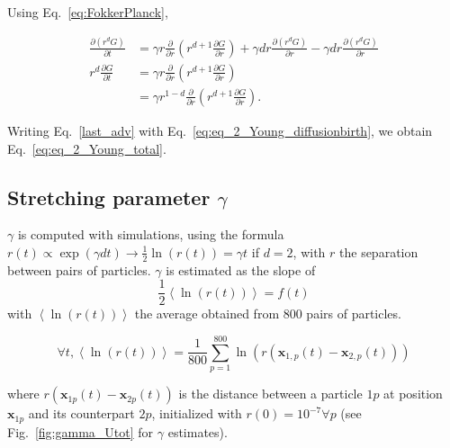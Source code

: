 Using Eq.~\ref{eq:FokkerPlanck},

\begin{subequations}

\begin{align}
\frac{\partial(r^{d}G)}{\partial t} & =\gamma r\frac{\partial}{\partial r}\left(r^{d+1}\frac{\partial G}{\partial r}\right)+\gamma dr\frac{\partial(r^{d}G)}{\partial r}-\gamma dr\frac{\partial(r^{d}G)}{\partial r}\label{computedGdQ1-1-1}\\
r^{d}\frac{\partial G}{\partial t} & =\gamma r\frac{\partial}{\partial r}\left(r^{d+1}\frac{\partial G}{\partial r}\right)\label{computedGdQ2-1-1}\\
 & =\gamma r^{1-d}\frac{\partial}{\partial r}\left(r^{d+1}\frac{\partial G}{\partial r}\right).\label{last_adv}
\end{align}

\end{subequations}

Writing Eq.~\ref{last_adv} with Eq.~\ref{eq:eq_2_Young_diffusionbirth}, we obtain Eq.~\ref{eq:eq_2_Young_total}. 

\subsection*{Stretching parameter $\gamma$}

$\gamma$ is computed with simulations, using the formula $r(t)\propto \exp(\gamma dt)\rightarrow\frac{1}{2}\ln(r(t))=\gamma t$
if $d=2$, with $r$ the separation between pairs of particles. $\gamma$ is estimated as the slope of $$\frac{1}{2}\left\langle \ln(r(t))\right\rangle =f(t)$$ with $\left\langle \ln(r(t))\right\rangle $ the average obtained from 800 pairs of particles. 

$$\forall t,\left\langle \ln(r(t))\right\rangle =\frac{1}{800}\sum_{p=1}^{800}\ln(r(\boldsymbol{x}_{1,p}(t)-\boldsymbol{x}_{2,p}(t)))$$ 

where $r(\boldsymbol{x}_{1p}(t)-\boldsymbol{x}_{2p}(t))$ is the distance between a particle $1p$ at position $\boldsymbol{x}_{1p}$ and its counterpart $2p$, initialized with $r(0)=10^{-7}\forall p$ (see Fig.~\ref{fig:gamma_Utot} for $\gamma$ estimates).

